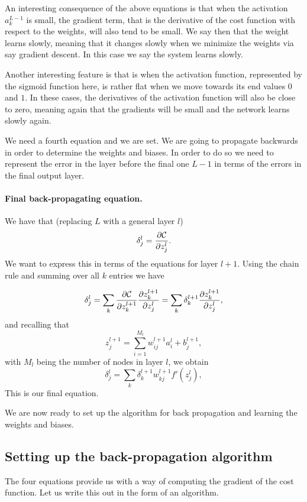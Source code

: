 \documentclass[%
oneside,                 %
final,                   %
10pt]{article}
\begin{document}
An interesting consequence of the above equations is that when the
activation $a_k^{L-1}$ is small, the gradient term, that is the
derivative of the cost function with respect to the weights, will also
tend to be small. We say then that the weight learns slowly, meaning
that it changes slowly when we minimize the weights via say gradient
descent. In this case we say the system learns slowly.

Another interesting feature is that is when the activation function,
represented by the sigmoid function here, is rather flat when we move towards
its end values $0$ and $1$. In these
cases, the derivatives of the activation function will also be close
to zero, meaning again that the gradients will be small and the
network learns slowly again.



We need a fourth equation and we are set. We are going to propagate
backwards in order to determine the weights and biases. In order
to do so we need to represent the error in the layer before the final
one $L-1$ in terms of the errors in the final output layer.

\paragraph{Final back-propagating equation.}
We have that (replacing $L$ with a general layer $l$)
\[
\delta_j^l =\frac{\partial {\cal C}}{\partial z_j^l}.
\]
We want to express this in terms of the equations for layer $l+1$. Using the chain rule and summing over all $k$ entries we have

\[
\delta_j^l =\sum_k \frac{\partial {\cal C}}{\partial z_k^{l+1}}\frac{\partial z_k^{l+1}}{\partial z_j^{l}}=\sum_k \delta_k^{l+1}\frac{\partial z_k^{l+1}}{\partial z_j^{l}},
\]
and recalling that
\[
z_j^{l+1} = \sum_{i=1}^{M_{l}}w_{ij}^{l+1}a_i^{l}+b_j^{l+1},
\]
with $M_l$ being the number of nodes in layer $l$, we obtain
\[
\delta_j^l =\sum_k \delta_k^{l+1}w_{kj}^{l+1}f'(z_j^l),
\]
This is our final equation.

We are now ready to set up the algorithm for back propagation and learning the weights and biases.

\subsection{Setting up the back-propagation algorithm}



The four equations  provide us with a way of computing the gradient of the cost function. Let us write this out in the form of an algorithm.
\end{document}
